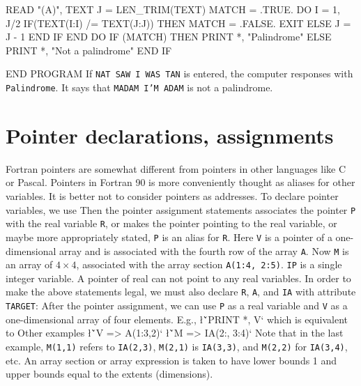 {   READ "(A)", TEXT
   J = LEN_TRIM(TEXT)
   MATCH = .TRUE.
   DO I = 1, J/2
      IF(TEXT(I:I) /= TEXT(J:J)) THEN
         MATCH = .FALSE.
         EXIT
      ELSE
         J = J - 1
      END IF
   END DO
   IF (MATCH) THEN
      PRINT *, "Palindrome"
   ELSE
      PRINT *, "Not a palindrome"
   END IF

END PROGRAM
\tted
If {\tt NAT SAW I WAS TAN} is entered, the computer responses with
{\tt Palindrome}.  It says that {\tt MADAM I'M ADAM} is
not a palindrome.


\section{Pointer declarations, assignments}
Fortran pointers are somewhat different from pointers in other languages
like C or Pascal.  Pointers in Fortran 90 is more conveniently thought
as aliases for other variables.  It is better not to consider pointers
as addresses. To declare pointer variables, we use
\sms
{}
\sms
Then the pointer assignment statements
\sms
{}
\sms
associates the pointer {\tt P} with the real variable {\tt R}, or
makes the pointer pointing to the real variable, or maybe more
appropriately stated, {\tt P} is an alias for {\tt R}.  
Here {\tt V} is a pointer of a one-dimensional array and 
is associated with the fourth row of the array {\tt A}.  
Now {\tt M} is an array of $4\times 4$, associated with the array
section {\tt A(1:4, 2:5)}.  {\tt IP} is a single integer variable.
A pointer
of real can not point to any real variables.  In order to make the
above statements legal, we must also declare {\tt R}, {\tt A}, 
and {\tt IA} with attribute {\tt TARGET}:
\sms
{}
\sms
After the pointer assignment, we can use {\tt P} as a real variable and
{\tt V} as a one-dimensional array of four elements.  E.g.,
\sms
{}
\l{\v`PRINT *, V`}
\sms
which is equivalent to 
\sms
{}
\sms
Other examples
\sms
\l{\v`V => A(1:3,2)`}
\l{\v`M => IA(2:, 3:4)`}
Note that in the last example, {\tt M(1,1)} refers to {\tt IA(2,3)},
{\tt M(2,1)} is {\tt IA(3,3)}, and {\tt M(2,2)} for {\tt IA(3,4)}, etc.
An array section or array expression is taken to have lower bounds 1
and upper bounds equal to the extents (dimensions).

}

